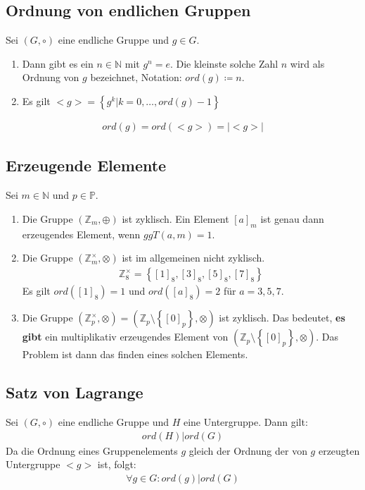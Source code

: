 \subsection{Ordnung von endlichen Gruppen}
Sei $(G, \circ)$ eine endliche Gruppe und $g\in G$.
\begin{enumerate}
    \item Dann gibt es ein $n\in \mathbb{N}$ mit $g^n=e$.
    Die kleinste solche Zahl $n$ wird als Ordnung von $g$ bezeichnet, Notation: $ord(g)\coloneqq n$.
    \item Es gilt $<g>=\left\{ g^k|k=0,\dots,ord(g)-1 \right\}$
\end{enumerate}
\begin{align}
    ord(g)=ord(<g>)=|<g>|
\end{align}
\subsection{Erzeugende Elemente}
Sei $m\in \mathbb{N}$ und $p\in \mathbb{P}$.
\begin{enumerate}
    \item Die Gruppe $(\mathbb{Z}_m, \oplus)$ ist zyklisch.
    Ein Element $[a]_m$ ist genau dann erzeugendes Element, wenn $ggT(a,m)=1$.
    \item Die Gruppe $(\mathbb{Z}_m^\times, \otimes)$ ist im allgemeinen nicht zyklisch.
    \begin{align}
        \mathbb{Z}_8^\times=\left\{ [1]_8, [3]_8, [5]_8, [7]_8\right\}
    \end{align}
    Es gilt $ord([1]_8)=1$ und $ord([a]_8)=2$ für $a=3,5,7$.
    \item Die Gruppe $(\mathbb{Z}_p^\times, \otimes)=(\mathbb{Z}_p \setminus \left\{ [0]_p\right\}, \otimes)$ ist zyklisch.
    Das bedeutet, \textbf{es gibt} ein multiplikativ erzeugendes Element von $(\mathbb{Z}_p\setminus \left\{ [0]_p \right\}, \otimes)$.
    Das Problem ist dann das finden eines solchen Elements.
\end{enumerate}

\subsection{Satz von Lagrange}
Sei $(G, \circ)$ eine endliche Gruppe und $H$ eine Untergruppe.
Dann gilt:
\begin{align*}
    ord(H)|ord(G)
\end{align*}
Da die Ordnung eines Gruppenelements $g$ gleich der Ordnung der von $g$ erzeugten Untergruppe $<g>$ ist, folgt:
\begin{align*}
    \forall g\in G: ord(g)|ord(G)
\end{align*}

